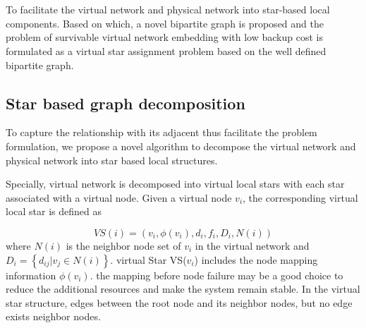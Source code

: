

\section{}
\label{lab:Graphdecompositionbasedproblemformulation}
 To facilitate  the virtual network and physical network into star-based local components. Based on which, a novel   bipartite graph is proposed and the problem of survivable virtual network embedding with low backup cost is formulated as a virtual star assignment problem based on the well defined bipartite graph.


\subsection{Star based graph decomposition}
To capture  the relationship  with its adjacent  thus facilitate the problem formulation, we propose a novel algorithm to decompose the virtual network and physical network into star based local structures.


Specially,  virtual network is decomposed into virtual local stars with each star associated with a virtual node. Given a virtual node $v_i$, the corresponding virtual local star is defined as 

\begin{equation}
VS(i)=(v_i, \phi(v_i), d_i, f_i, D_i, N(i))
\label{eq:virtualstar}
\end{equation}
where $N(i)$ is the neighbor node set of $v_i$ in the virtual network and  ${D_i} = \left\{ {{d_{ij}}|{v_j} \in {N(i)}} \right\}$.  virtual Star VS($v_i$) includes the node mapping information $\phi(v_i)$.  the mapping before node failure may be a good choice to reduce the additional resources and make the system remain stable. In the virtual star structure,  edges  between the root node and its neighbor nodes, but no edge exists  neighbor nodes.

